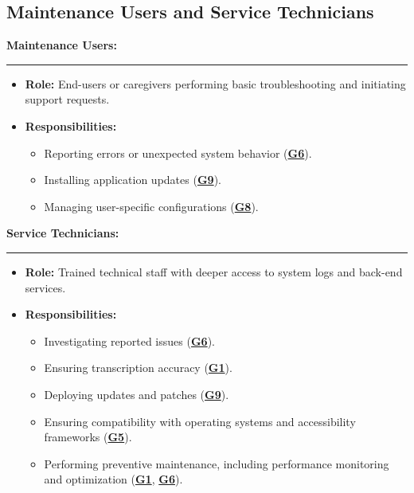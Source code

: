 \documentclass[11pt]{article}
\begin{document}
\subsection{Maintenance Users and Service Technicians}
\textbf{Maintenance Users:}\\
\hrule
\begin{itemize}
    \item \textbf{Role:} End-users or caregivers performing basic troubleshooting and initiating support requests.
    \item \textbf{Responsibilities:} 
        \begin{itemize}
            \item Reporting errors or unexpected system behavior (\textbf{\hyperref[tab:project-goals]{G6}}).
            \item Installing application updates (\textbf{\hyperref[tab:project-goals]{G9}}).
            \item Managing user-specific configurations (\textbf{\hyperref[tab:project-goals]{G8}}).
        \end{itemize}
\end{itemize}
\vspace{1em}
\textbf{Service Technicians:}\\
\hrule
\begin{itemize}
    \item \textbf{Role:} Trained technical staff with deeper access to system logs and back-end services.
    \item \textbf{Responsibilities:}
        \begin{itemize}
            \item Investigating reported issues (\textbf{\hyperref[tab:project-goals]{G6}}).
            \item Ensuring transcription accuracy (\textbf{\hyperref[tab:project-goals]{G1}}).
            \item Deploying updates and patches (\textbf{\hyperref[tab:project-goals]{G9}}).
            \item Ensuring compatibility with operating systems and accessibility frameworks (\textbf{\hyperref[tab:project-goals]{G5}}).
            \item Performing preventive maintenance, including performance monitoring and optimization (\textbf{\hyperref[tab:project-goals]{G1}}, \textbf{\hyperref[tab:project-goals]{G6}}).
        \end{itemize}
\end{itemize}
\end{document}
